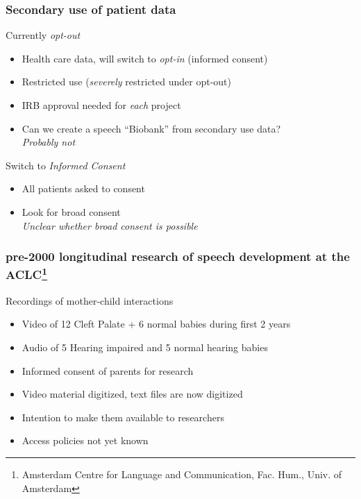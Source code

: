 \documentclass[xcolor=dvipsnames]{beamer}
\begin{document}
\begin{frame}
	\frametitle{Secondary use of patient data}
		
	\begin{block}{Currently {\em opt-out}}
	\begin{itemize}
	\item Health care data, will switch to {\em opt-in} (informed consent)
	\item Restricted use ({\em severely} restricted under opt-out) 
	\item IRB approval needed for {\color{Maroon} \em each} project
	\item Can we create a speech ``Biobank'' from secondary use data? \\
	{\em Probably not}
	\end{itemize}
	\end{block}	
	\begin{block}{Switch to {\em Informed Consent}}
	\begin{itemize}
	\item All patients asked to consent
	\item Look for broad consent \\
	{\em Unclear whether broad consent is possible}
	\end{itemize}
	\end{block}	
	
\end{frame}

\begin{frame}
	\frametitle{pre-2000 longitudinal research of speech development at the ACLC\footnote[frame]{\scriptsize Amsterdam Centre for Language and Communication, Fac. Hum., Univ. of Amsterdam}}
		
	\begin{block}{Recordings of mother-child interactions}
	\begin{itemize}
	\item Video of 12 Cleft Palate + 6 normal babies during first 2 years {\scriptsize \cite{koopmans1986early}}
	\item Audio of 5 Hearing impaired and 5 normal hearing babies {\scriptsize \cite{clement1994development,vanderstelt2008deaf}}
	\item Informed consent of parents for research
	\item Video material digitized, text files are now digitized
	\item Intention to make them available to researchers
	\item Access policies not yet known
	\end{itemize}
	\end{block}	
	
\end{frame}
\end{document}
